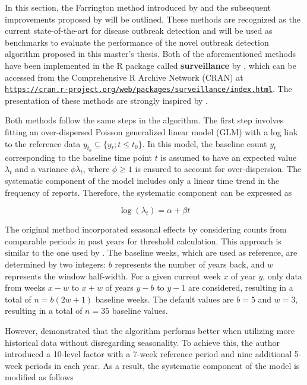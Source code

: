 \documentclass[a4paper,twoside,11pt]{report} %
\theoremstyle{definition}
\theoremstyle{definition}
\theoremstyle{definition}
\theoremstyle{definition}
\theoremstyle{remark}
\begin{document}
In this section, the Farrington method introduced by \textcite{Farrington_1996} and the subsequent improvements proposed by \textcite{Noufaily_2013} will be outlined. These methods are recognized as the current state-of-the-art for disease outbreak detection and will be used as benchmarks to evaluate the performance of the novel outbreak detection algorithm proposed in this master's thesis. Both of the aforementioned methods have been implemented in the R package called \textbf{surveillance} by \textcite{Salmon_2016}, which can be accessed from the Comprehensive R Archive Network (CRAN) at \href{https://cran.r-project.org/web/packages/surveillance/index.html}{\nolinkurl{https://cran.r-project.org/web/packages/surveillance/index.html}}. The presentation of these methods are strongly inspired by \textcite{Salmon_2016}.

Both methods follow the same steps in the algorithm. The first step involves fitting an over-dispersed Poisson generalized linear model (GLM) with a log link to the reference data \(y_{t_{0}}\subseteq\{y_t;t\leq t_0\}\). In this model, the baseline count \(y_t\) corresponding to the baseline time point \(t\) is assumed to have an expected value \(\lambda_t\) and a variance \(\phi\lambda_t\), where \(\phi\geq1\) is ensured to account for over-dispersion. The systematic component of the model includes only a linear time trend in the frequency of reports. Therefore, the systematic component can be expressed as

\begin{equation}
  \log(\lambda_t)=\alpha+\beta t
\end{equation}

The original method incorporated seasonal effects by considering counts from comparable periods in past years for threshold calculation. This approach is similar to the one used by \textcite{Stroup_1989}. The baseline weeks, which are used as reference, are determined by two integers: \(b\) represents the number of years back, and \(w\) represents the window half-width. For a given current week \(x\) of year \(y\), only data from weeks \(x-w\) to \(x+w\) of years \(y-b\) to \(y-1\) are considered, resulting in a total of \(n=b(2w+1)\) baseline weeks. The default values are \(b=5\) and \(w=3\), resulting in a total of \(n=35\) baseline values.

However, \textcite{Noufaily_2013} demonstrated that the algorithm performs better when utilizing more historical data without disregarding seasonality. To achieve this, the author introduced a 10-level factor with a 7-week reference period and nine additional 5-week periods in each year. As a result, the systematic component of the model is modified as follows
\end{document}
